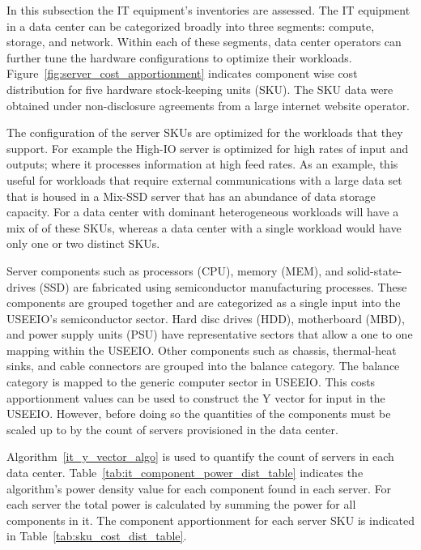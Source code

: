         In this subsection the IT equipment's inventories are assessed. The IT equipment in a data center can be categorized broadly into three segments: compute, storage, and network. Within each of these segments, data center operators can further tune the hardware configurations to optimize their workloads. Figure~\ref{fig:server_cost_apportionment} indicates component wise cost distribution for five hardware stock-keeping units (SKU). The SKU data were obtained under non-disclosure agreements from a large internet website operator.  
        
        
        
        The configuration of the server SKUs are optimized for the workloads that they support. For example the High-IO server is optimized for high rates of input and outputs; where it processes information at high feed rates. As an example, this useful for workloads that require external communications with a large data set that is housed in a Mix-SSD server that has an abundance of data storage capacity. For a data center with dominant heterogeneous workloads will have a mix of of these SKUs, whereas a data center with a single workload would have only one or two distinct SKUs.
        
        Server components such as processors (CPU), memory (MEM), and solid-state-drives (SSD) are fabricated using semiconductor manufacturing processes. These components are grouped together and are categorized as a single input into the USEEIO’s semiconductor sector. Hard disc drives (HDD), motherboard (MBD), and power supply units (PSU) have representative sectors that allow a one to one mapping within the USEEIO. Other components such as chassis, thermal-heat sinks, and cable connectors are grouped into the balance category. The balance category is mapped to the generic computer sector in USEEIO. This costs apportionment values can be used to construct the Y vector for input in the USEEIO. However, before doing so the quantities of the components must be scaled up to by the count of servers provisioned in the data center.
        
         Algorithm~\ref{it_y_vector_algo} is used to quantify the count of servers in each data center. Table~\ref{tab:it_component_power_dist_table} indicates the algorithm's power density value for each component found in each server. For each server the total power is calculated by summing the power for all components in it. The component apportionment for each server SKU is indicated in Table~\ref{tab:sku_cost_dist_table}.
         

